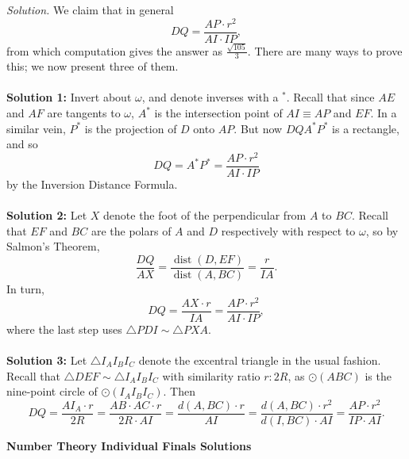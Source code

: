 \documentclass[10pt]{article}
\newcommand{\solution}
{
\vspace{3pt}
\noindent\textit{Solution.}\qquad
}
\begin{document}
\begin{enumerate}
\solution We claim that in general \[DQ = \frac{AP\cdot r^2}{AI\cdot IP},\] from which computation gives the answer as $\boxed{\tfrac{\sqrt{105}}3}$.  There are many ways to prove this; we now present three of them.  \\
\\
\textbf{Solution 1:} Invert about $\omega$, and denote inverses with a $^*$.  Recall that since $AE$ and $AF$ are tangents to $\omega$, $A^*$ is the intersection point of $AI\equiv AP$ and $EF$.  In a similar vein, $P^*$ is the projection of $D$ onto $AP$.  But now $DQA^*P^*$ is a rectangle, and so \[DQ = A^*P^* = \frac{AP\cdot r^2}{AI\cdot IP}\] by the Inversion Distance Formula.\\
\\
\textbf{Solution 2:} Let $X$ denote the foot of the perpendicular from $A$ to $BC$.  Recall that $EF$ and $BC$ are the polars of $A$ and $D$ respectively with respect to $\omega$, so by Salmon's Theorem, \[\frac{DQ}{AX} = \frac{\operatorname{dist}(D,EF)}{\operatorname{dist}(A,BC)} = \frac{r}{IA}.\] In turn, \[DQ = \frac{AX\cdot r}{IA} = \frac{AP\cdot r^2}{AI\cdot IP},\] where the last step uses $\triangle PDI\sim\triangle PXA$.\\
\\
\textbf{Solution 3:} Let $\triangle I_AI_BI_C$ denote the excentral triangle in the usual fashion. Recall that $\triangle DEF \sim \triangle I_AI_BI_C$ with similarity ratio $r:2R$, as $\odot(ABC)$ is the nine-point circle of $\odot(I_AI_BI_C)$. Then $$DQ=\frac{AI_A\cdot r}{2R}=\frac{AB\cdot AC\cdot r}{2R\cdot AI}=\frac{d(A,BC)\cdot r}{AI}=\frac{d(A,BC)\cdot r^2}{d(I,BC)\cdot AI}=\frac{AP\cdot r^2}{IP\cdot AI}.$$

\end{enumerate}

\newpage

\begin{center}
\huge\textbf{Number Theory Individual Finals Solutions}
\end{center} \vspace{3pt}
\end{document}
